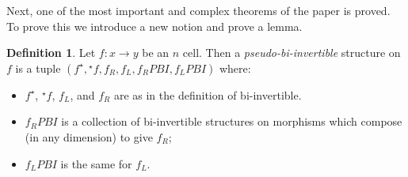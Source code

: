 \documentclass{article}
\theoremstyle{definition}
\newtheorem{definition}{Definition}
\theoremstyle{remark}
\newcommand{\linv}[1]{{}^\star\!#1}
\newcommand{\rinv}[1]{#1^\star}
\begin{document}
\noindent Next, one of the most important and complex theorems of the paper is proved. To prove this we introduce a new notion and prove a lemma.

\begin{definition}
  Let \(f : x \to y\) be an \(n\) cell. Then a \emph{pseudo-bi-invertible} structure on \(f\) is a tuple \((\rinv f, \linv f, f_R, f_L, f_R{}PBI, f_L{}PBI)\) where:
  \begin{itemize}
  \item \(\rinv f\), \(\linv f\), \(f_L\), and \(f_R\) are as in the definition of bi-invertible.
  \item \(f_R{}PBI\) is a collection of bi-invertible structures on morphisms which compose (in any dimension) to give \(f_R\);
  \item \(f_L{}PBI\) is the same for \(f_L\).
  \end{itemize}
\end{definition}
\end{document}
